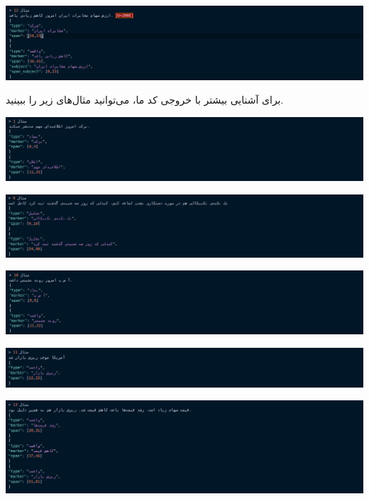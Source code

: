 \documentclass[a4paper,12pt]{article}
\begin{document}
\begin{center}
	\includegraphics[scale=0.5, trim ={0 0 17cm 0}, clip]{images/12.png}
\end{center}


برای آشنایی بیشتر با خروجی کد ما، می‌توانید مثال‌های زیر را ببینید. 

\begin{center}
	\includegraphics[scale=0.5, trim ={0 0 17cm 0}, clip]{images/1.png}

	\includegraphics[scale=0.5, trim ={0 0 17cm 0}, clip]{images/9.png}

	\includegraphics[scale=0.5, trim ={0 0 17cm 0}, clip]{images/10.png}

	\includegraphics[scale=0.5, trim ={0 0 17cm 0}, clip]{images/11.png}

	\includegraphics[scale=0.5, trim ={0 0 17cm 0}, clip]{images/13.png}


\end{center}
\end{document}
